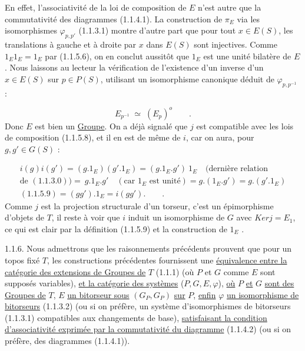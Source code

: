 En effet, l'associativité de la loi de composition de $E$ n'est autre que la commutativité des diagrammes (1.1.4.1). La construction de $\pi_E$ via les isomorphismes $\varphi_{p,p'}$ (1.1.3.1) montre d'autre part que pour tout $x \in E(S)$, les translations à gauche et à droite par $x$ dans $E(S)$ sont injectives. Comme $1_E1_E = 1_E$ par (1.1.5.6), on en conclut aussitôt que $1_E$ est une unité bilatère de $E$. Nous laissons au lecteur la vérification de l'existence d'un inverse d'un $x \in E(S)$ sur $p \in P(S)$, utilisant un isomorphisme canonique déduit de $\varphi_{p,p^{-1}}$ :

\begin{equation}\tag{1.1.5.10}
E_{p^{-1}} \;\simeq\; (E_p)^{o} \qquad .
\end{equation}
Donc $E$ est bien un \underline{Groupe}. On a déjà signalé que $j$ est compatible avec les lois de composition (1.1.5.8), et il en est de même de $i$, car on aura, pour $g,g' \in G(S)$ :

\begin{multline*}
i(g)i(g') = (g.1_E)(g'.1_E) = (g.1_E.g')\ 1_E \quad (\text{dernière relation} \\ \text{de } (1.1.3.0)) = \ g.1_E.g' \quad (\text{car } 1_E \text{ est unité}) = g.(1_E.g') = g.(g'.1_E) \\ (1.1.5.9) = (gg').1_E = i(gg'). \qquad .
\end{multline*}
Comme $j$ est la projection structurale d'un torseur, c'est un épimorphisme d'objets de \underline{$T$}, il reste à voir que $i$ induit un isomorphisme de $G$ avec $Ker j = E_1$, ce qui est clair par la définition (1.1.5.9) et la construction de $1_E$ .



1.1.6.  Nous admettrons que les raisonnements précédents prouvent que pour un topos fixé \underline{$T$}, les constructions précédentes fournissent une \underline{équivalence entre la catégorie des extensions de Groupes de} \underline{$T$} (1.1.1) (où $P$ et $G$ comme $E$ sont supposés variables), \underline{et la catégorie des systèmes} ($P,G,E,\varphi$), \underline{où} $P$ \underline{et} $G$ \underline{sont des Groupes de} \underline{$T$}, $E$ \underline{un bitorseur sous} $(G_P,G_P)$ \underline{sur} $P$, \underline{enfin} $\varphi$ \underline{un isomorphisme de bitorseurs} (1.1.3.2) (ou si on préfère, un système d'isomorphismes de bitorseurs (1.1.3.1) compatibles aux changements de base), \underline{satisfaisant la condition d'associativité exprimée par la commutativité du diagramme} (1.1.4.2) (ou si on préfère, des diagrammes (1.1.4.1)).

